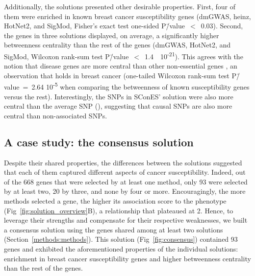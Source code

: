 \documentclass[10pt,letterpaper]{article}
\providecommand{\DIFaddtex}[1]{{\protect\color{blue}\uwave{#1}}} %
\providecommand{\DIFaddbegin}{} %
\providecommand{\DIFaddend}{} %
\providecommand{\DIFadd}[1]{\texorpdfstring{\DIFaddtex{#1}}{#1}} %
\newcommand{\DIFaddincludegraphics}[2][]{{\color{blue}\fbox{\DIFOincludegraphics[#1]{#2}}}} %
\DeclareRobustCommand{\DIFaddbegin}{\DIFOaddbegin \let\includegraphics\DIFaddincludegraphics} %
\DeclareRobustCommand{\DIFaddend}{\DIFOaddend \let\includegraphics\DIFOincludegraphics} %
\begin{document}
Additionally, the solutions presented other desirable properties. First, four of them were enriched in known breast cancer susceptibility genes (dmGWAS, heinz, HotNet2, and SigMod, Fisher's exact test one-sided P\=/value~$<$~0.03). Second, the genes in three solutions displayed, on average, a significantly higher betweenness centrality than the rest of the genes (dmGWAS, HotNet2, and SigMod, Wilcoxon rank-sum test P\=/value~$<$~1.4~\texttimes{}~10\textsuperscript{-21}). This agrees with the notion that disease genes are more central than other non-essential genes \cite{pinero_uncovering_2016}, an observation that holds in breast cancer (one-tailed Wilcoxon rank-sum test P\=/value~=~2.64 \texttimes{} 10\textsuperscript{-5} when comparing the betweenness of known susceptibility genes versus the rest). Interestingly, the SNPs in SConES' solution were also more central than the average SNP (), suggesting that causal SNPs are also more central than non-associated SNPs.

\subsection{A case study: the consensus solution}
\label{results:consensus}

Despite their shared properties, the differences between the solutions suggested that each of them captured different aspects of cancer susceptibility. Indeed, out of the 668 genes that were selected by at least one method, only 93 were selected by at least two, 20 by three, and none by four or more. Encouragingly, the more methods selected a gene, the higher its association score to the phenotype (Fig~\ref{fig:solution_overview}B), a relationship that plateaued at 2. Hence, to leverage their strengths and compensate for their respective weaknesses, we built a consensus solution using the genes shared among at least two solutions (Section~\ref{methods:methods}). This solution (Fig~\ref{fig:consensus}\DIFaddbegin \DIFadd{A}\DIFaddend ) contained 93 genes and exhibited the aforementioned properties of the individual solutions: enrichment in breast cancer susceptibility genes and higher betweenness centrality than the rest of the genes. 
\end{document}
